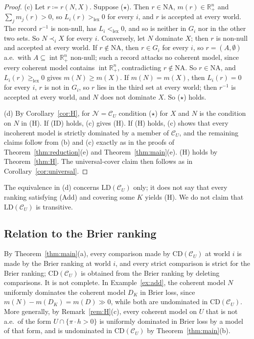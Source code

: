 \documentclass[11pt]{article}
\newcommand{\R}{\mathbb{R}}
\newcommand{\CC}{\mathcal{C}}
\newcommand{\NN}{\mathcal{N}}
\newcommand{\CD}{\mathrm{CD}}
\newcommand{\Rp}{\R^n_{+}}
\newcommand{\Rpp}{\inter\R^n_{+}}
\DeclareMathOperator{\inter}{int}
\theoremstyle{plain}
\theoremstyle{definition}
\theoremstyle{remark}
\begin{document}
\begin{proof}
(c) Let $r\coloneqq r(N,X)$. Suppose ($\star$). Then $r\in\mathrm{NA}$, $m(r)\in\Rp$
and $\sum_jm_j(r)>0$, so $L_i(r)>_{\mathrm{lex}}0$ for every $i$, and $r$ is accepted at
every world. The record $r^{-1}$ is non-null, has $L_i<_{\mathrm{lex}}0$, and so is
neither in $G_i$ nor in the other two sets. So $N\prec_iX$ for every $i$. Conversely, let
$N$ dominate $X$; then $r$ is non-null and accepted at every world. If $r\notin
\mathrm{NA}$, then $r\in G_i$ for every $i$, so $r=(A,\emptyset)$ a.e.\ with $A\subseteq
\Rpp$ non-null; such a record attacks no coherent model, since every coherent model
contains $\Rpp$, contradicting $r\notin\mathrm{NA}$. So $r\in\mathrm{NA}$, and
$L_i(r)\ge_{\mathrm{lex}}0$ gives $m(N)\ge m(X)$. If $m(N)=m(X)$, then $L_i(r)=0$ for
every $i$, $r$ is not in $G_i$, so $r$ lies in the third set at every world; then
$r^{-1}$ is accepted at every world, and $N$ does not dominate $X$. So ($\star$) holds.

(d) By Corollary~\ref{cor:H}, for $\NN=\CC_U$ condition ($\star$) for $X$ and $N$ is the
condition on $N$ in (H). If (ID) holds, (c) gives (H). If (H) holds, (c) shows that every
incoherent model is strictly dominated by a member of $\CC_U$, and the remaining claims
follow from (b) and (c) exactly as in the proofs of Theorem~\ref{thm:reduction}(e) and
Theorem~\ref{thm:main}(e). (H) holds by Theorem~\ref{thm:H}. The universal-cover claim
then follows as in Corollary~\ref{cor:universal}.
\end{proof}

The equivalence in (d) concerns $\mathrm{LD}(\CC_U)$ only; it does not say that every
ranking satisfying (Add) and covering some $K$ yields (H). We do not claim that
$\mathrm{LD}(\CC_U)$ is transitive.

\subsection{Relation to the Brier ranking}

By Theorem~\ref{thm:main}(a), every comparison made by $\CD(\CC_U)$ at world $i$ is made
by the Brier ranking at world $i$, and every strict comparison is strict for the Brier
ranking; $\CD(\CC_U)$ is obtained from the Brier ranking by deleting comparisons. It is
not complete. In Example~\ref{ex:add}, the coherent model $N$ uniformly dominates the
coherent model $D_K$ in Brier loss, since $m(N)-m(D_K)=m(D)\gg0$, while both are
undominated in $\CD(\CC_U)$. More generally, by Remark~\ref{rem:H}(c), every coherent
model on $U$ that is not a.e.\ of the form $U\cap\{\pi\cdot h>0\}$ is uniformly dominated
in Brier loss by a model of that form, and is undominated in $\CD(\CC_U)$ by
Theorem~\ref{thm:main}(b).
\end{document}
